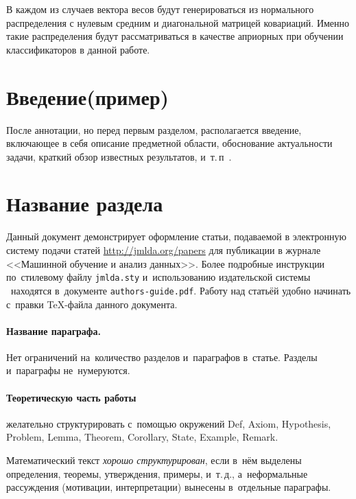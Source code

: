 \documentclass[12pt,twoside]{article}
\begin{document}
В каждом из случаев вектора весов будут генерироваться из нормального распределения с нулевым средним и диагональной матрицей ковариаций. Именно такие распределения будут рассматриваться в качестве априорных при обучении классификаторов в данной работе. 

\section{Введение(пример)}
После аннотации, но перед первым разделом,
располагается введение, включающее в себя
описание предметной области,
обоснование актуальности задачи,
краткий обзор известных результатов,
и~т.\,п~\cite{author09anyscience,myHandbook,author09first-word-of-the-title,voron06latex,author-and-co2007,Lvovsky03}.

\section{Название раздела}
Данный документ демонстрирует оформление статьи,
подаваемой в электронную систему подачи статей \url{http://jmlda.org/papers} для публикации в журнале <<Машинной обучение и анализ данных>>.
Более подробные инструкции по~стилевому файлу \texttt{jmlda.sty}
и~использованию издательской системы \LaTeXe\
находятся в~документе \texttt{authors-guide.pdf}.
Работу над статьёй удобно начинать с~правки \TeX-файла данного документа.

\paragraph{Название параграфа.}
Нет ограничений на~количество разделов и~параграфов в~статье.
Разделы и~параграфы не~нумеруются.

\paragraph{Теоретическую часть работы} желательно структурировать
с~помощью окружений
Def, Axiom, Hypothesis, Problem, Lemma, Theorem, Corollary, State, Example, Remark.

\begin{Def}
    Математический текст \emph{хорошо структурирован},
    если в~нём выделены определения, теоремы, утверждения, примеры, и~т.\,д.,
    а~неформальные рассуждения (мотивации, интерпретации)
    вынесены в~отдельные параграфы.
\end{Def}
\end{document}
